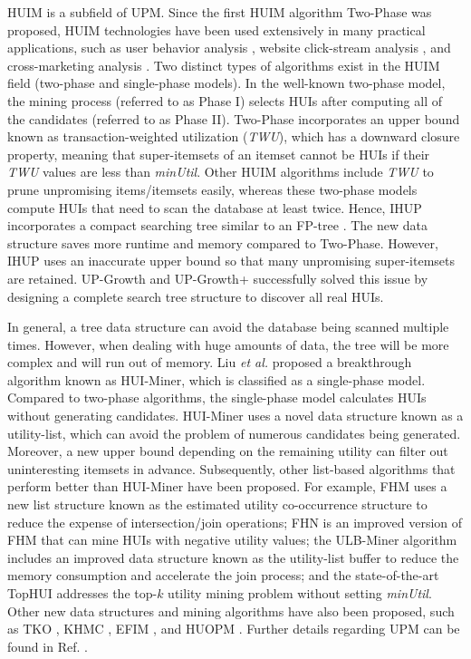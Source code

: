 \documentclass[journal]{IEEEtran}
\begin{document}
HUIM is a subfield of UPM. Since the first HUIM algorithm Two-Phase \cite{liu2005two} was proposed, HUIM technologies have been used extensively in many practical applications, such as user behavior analysis \cite{shie2013mining}, website click-stream analysis \cite{chu2008efficient}, and cross-marketing analysis \cite{yen2007mining}. Two distinct types of algorithms exist in the HUIM field (two-phase and single-phase models). In the well-known two-phase model, the mining process (referred to as Phase I) selects HUIs after computing all of the candidates (referred to as Phase II). Two-Phase incorporates an upper bound known as transaction-weighted utilization (\textit{TWU}), which has a downward closure property, meaning that super-itemsets of an itemset cannot be HUIs if their \textit{TWU} values are less than \textit{minUtil}. Other HUIM algorithms include \textit{TWU} to prune unpromising items/itemsets easily, whereas these two-phase models compute HUIs that need to scan the database at least twice. Hence, IHUP \cite{ahmed2009efficient} incorporates a compact searching tree similar to an FP-tree \cite{han2000mining}. The new data structure saves more runtime and memory compared to Two-Phase. However, IHUP uses an inaccurate upper bound so that many unpromising super-itemsets are retained. UP-Growth \cite{tseng2010up} and UP-Growth+ \cite{tseng2012efficient} successfully solved this issue by designing a complete search tree structure to discover all real HUIs.


In general, a tree data structure can avoid the database being scanned multiple times. However, when dealing with huge amounts of data, the tree will be more complex and will run out of memory. Liu \textit{et al.} \cite{liu2012mining} proposed a breakthrough algorithm known as HUI-Miner, which is classified as a single-phase model. Compared to two-phase algorithms, the single-phase model calculates HUIs without generating candidates. HUI-Miner uses a novel data structure known as a utility-list, which can avoid the problem of numerous candidates being generated. Moreover, a new upper bound depending on the remaining utility can filter out uninteresting itemsets in advance. Subsequently, other list-based algorithms that perform better than HUI-Miner have been proposed. For example, FHM \cite{fournier2014fhm} uses a new list structure known as the estimated utility co-occurrence structure to reduce the expense of intersection/join operations; FHN \cite{lin2016fhn} is an improved version of FHM that can mine HUIs with negative utility values; the ULB-Miner algorithm \cite{duong2018efficient} includes an improved data structure known as the utility-list buffer to reduce the memory consumption and accelerate the join process; and the state-of-the-art TopHUI \cite{gan2020tophui} addresses the top-$k$ utility mining problem without setting \textit{minUtil}. Other new data structures and mining algorithms have also been proposed, such as TKO \cite{tseng2015efficient}, KHMC \cite{duong2016efficient}, EFIM \cite{zida2017efim}, and HUOPM \cite{gan2019huopm}. Further details regarding UPM can be found in Ref. \cite{gan2018privacy,gan2021survey}. 
\end{document}
